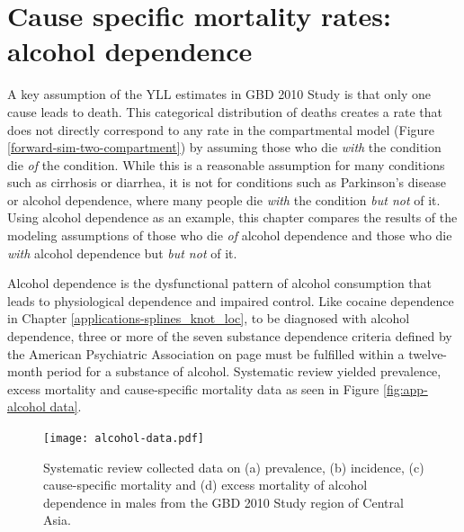\chapter{Cause specific mortality rates: alcohol dependence}
\label{applications-csmr}

A key assumption of the YLL estimates in GBD 2010 Study is that only
one cause leads to death.  This categorical distribution of deaths
creates a rate that does not directly correspond to any rate in the
compartmental model (Figure \ref{forward-sim-two-compartment}) by
assuming those who die \emph{with} the condition die \emph{of} the
condition.  While this is a reasonable assumption for many conditions
such as cirrhosis or diarrhea, it is not for conditions such as
Parkinson's disease or alcohol dependence, where many people die \emph{with}
the condition \emph{but not} of it.  Using alcohol dependence as an
example, this chapter compares the results of
the modeling assumptions of those who die \emph{of} alcohol dependence
and those who die \emph{with} alcohol dependence but \emph{but not} of it.

Alcohol dependence is the dysfunctional pattern of alcohol consumption
that leads to physiological dependence and impaired control.  Like
cocaine dependence in Chapter \ref{applications-splines_knot_loc}, to
be diagnosed with alcohol dependence, three or more of the seven
substance dependence criteria defined by the American Psychiatric
Association on page \pageref{page:app-substance_dependence} must be
fulfilled within a twelve-month period for a substance of alcohol. 
\cite{american_psychiatric_association_diagnostic_2000, hasin_prevalence_2007}
Systematic review yielded prevalence, excess mortality and
cause-specific mortality data as seen in Figure \ref{fig:app-alcohol
  data}.

    \begin{figure}[h]
        \begin{center}
            \texttt{[image: alcohol-data.pdf]}
            \caption{Systematic review collected data on (a) prevalence, 
              (b) incidence, (c) cause-specific mortality and (d) excess
              mortality of alcohol dependence in males from the GBD 2010
              Study region of Central Asia.}
            \label{fig:app-alcohol data}
        \end{center}
    \end{figure}

